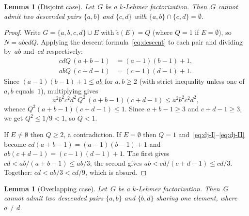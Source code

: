 \documentclass[11pt]{article}
\newtheorem{lemma}[theorem]{Lemma}
\theoremstyle{definition}
\theoremstyle{remark}
\newcommand{\eps}{\tilde{\epsilon}}
\begin{document}
\begin{lemma}[Disjoint case]\label{lem:disjoint}
Let~$G$ be a $k$-Lehmer factorization.  Then~$G$ cannot admit two
descended pairs $\{a,b\}$ and $\{c,d\}$ with
$\{a,b\} \cap \{c,d\} = \emptyset$.
\end{lemma}

\begin{proof}
Write $G = \{a, b, c, d\} \cup E$ with $\eps(E) = Q$ (where $Q = 1$ if
$E = \emptyset$), so $N = abcdQ$.  Applying the descent
formula~\eqref{eq:descent} to each pair and dividing by~$ab$ and~$cd$
respectively:
\begin{align}
  \label{eq:dj-I}
  cdQ\,(a+b-1) &= (a\!-\!1)(b\!-\!1)+1, \\
  \label{eq:dj-II}
  abQ\,(c+d-1) &= (c\!-\!1)(d\!-\!1)+1.
\end{align}
Since $(a-1)(b-1) + 1 \le ab$ for $a,b \ge 2$ (with strict inequality
unless one of $a, b$ equals~$1$), multiplying gives
\[
  a^2b^2c^2d^2\,Q^2\,(a\!+\!b\!-\!1)(c\!+\!d\!-\!1) \le a^2b^2c^2d^2,
\]
whence $Q^2(a+b-1)(c+d-1) \le 1$.  Since $a+b-1 \ge 3$ and $c+d-1 \ge 3$,
we get $Q^2 \le 1/9 < 1$, so $Q < 1$.

If $E \ne \emptyset$ then $Q \ge 2$, a contradiction.  If
$E = \emptyset$ then $Q = 1$ and~\eqref{eq:dj-I}--\eqref{eq:dj-II} become
$cd(a+b-1) = (a-1)(b-1)+1$ and $ab(c+d-1) = (c-1)(d-1)+1$.  The first
gives $cd < ab/(a+b-1) \le ab/3$; the second gives $ab < cd/(c+d-1) \le
cd/3$.  Together: $cd < ab/3 < cd/9$, which is absurd.
\end{proof}


\begin{lemma}[Overlapping case]\label{lem:overlap}
Let~$G$ be a $k$-Lehmer factorization.  Then~$G$ cannot admit two
descended pairs $\{a,b\}$ and $\{b,d\}$ sharing one element, where
$a \ne d$.
\end{lemma}
\end{document}
